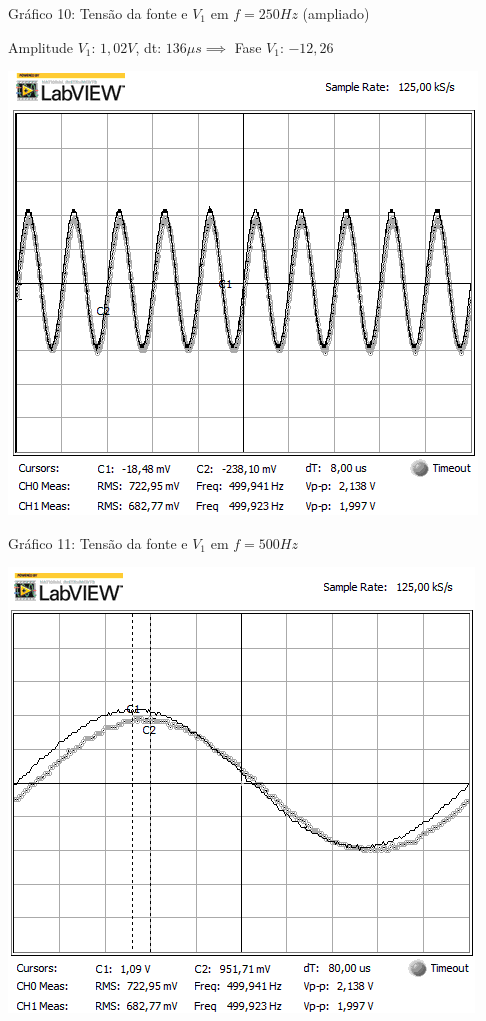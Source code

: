 \begin{center}
Gráfico 10: Tensão da fonte e $V_1$ em $f=250Hz$ (ampliado)
\end{center}

Amplitude $V_1$: $1,02V$, dt: $136\mu s\implies$ Fase $V_1$: $-12,26$\textdegree 

\newpage
\begin{table}[h]
\centering
\includegraphics[scale=0.725]{rgadicoas/rgadicoa2}
\end{table}

\begin{center}
Gráfico 11: Tensão da fonte e $V_1$ em $f=500Hz$ 
\end{center}

\begin{table}[h]
\centering
\includegraphics[scale=0.725]{rgadicoas/rgadicoa2-2}
\end{table}

